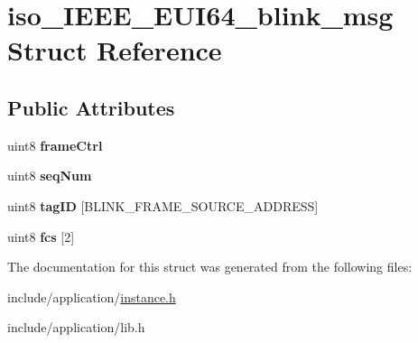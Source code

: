 \hypertarget{structiso__IEEE__EUI64__blink__msg}{\section{iso\-\_\-\-I\-E\-E\-E\-\_\-\-E\-U\-I64\-\_\-blink\-\_\-msg Struct Reference}
\label{structiso__IEEE__EUI64__blink__msg}
}
\subsection*{Public Attributes}
\begin{DoxyCompactItemize}
\item 
\hypertarget{structiso__IEEE__EUI64__blink__msg_afff25157218425dae9e9cab3aba7595e}{uint8 {\bfseries frame\-Ctrl}}\label{structiso__IEEE__EUI64__blink__msg_afff25157218425dae9e9cab3aba7595e}

\item 
\hypertarget{structiso__IEEE__EUI64__blink__msg_ab9cfdb2a7d72e3dc871f0062d76c5e2c}{uint8 {\bfseries seq\-Num}}\label{structiso__IEEE__EUI64__blink__msg_ab9cfdb2a7d72e3dc871f0062d76c5e2c}

\item 
\hypertarget{structiso__IEEE__EUI64__blink__msg_ad7f0876ca39811d6d4b2028ae97ed34e}{uint8 {\bfseries tag\-I\-D} \mbox{[}B\-L\-I\-N\-K\-\_\-\-F\-R\-A\-M\-E\-\_\-\-S\-O\-U\-R\-C\-E\-\_\-\-A\-D\-D\-R\-E\-S\-S\mbox{]}}\label{structiso__IEEE__EUI64__blink__msg_ad7f0876ca39811d6d4b2028ae97ed34e}

\item 
\hypertarget{structiso__IEEE__EUI64__blink__msg_afb3911aeca4848265c317801e3962199}{uint8 {\bfseries fcs} \mbox{[}2\mbox{]}}\label{structiso__IEEE__EUI64__blink__msg_afb3911aeca4848265c317801e3962199}

\end{DoxyCompactItemize}


The documentation for this struct was generated from the following files\-:\begin{DoxyCompactItemize}
\item 
include/application/\hyperlink{instance_8h}{instance.\-h}\item 
include/application/lib.\-h\end{DoxyCompactItemize}
